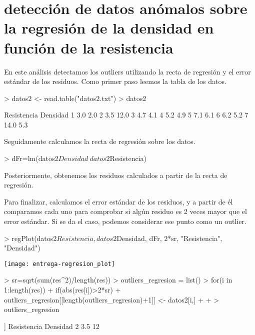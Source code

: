 \documentclass [a4paper] {article}
\begin{document}
\section{detección de datos anómalos sobre la regresión de la densidad en función de la resistencia}

En este análisis detectamos los outliers utilizando la recta de regresión y
el error estándar de los residuos. Como primer paso leemos la tabla de los datos.
\begin{Schunk}
\begin{Sinput}
> datos2 <- read.table("datos2.txt")
> datos2
\end{Sinput}
\begin{Soutput}
  Resistencia Densidad
1         3.0      2.0
2         3.5     12.0
3         4.7      4.1
4         5.2      4.9
5         7.1      6.1
6         6.2      5.2
7        14.0      5.3
\end{Soutput}
\end{Schunk}
Seguidamente calculamos la recta de regresión sobre los datos.
\begin{Schunk}
\begin{Sinput}
> dFr=lm(datos2$Densidad~datos2$Resistencia)
\end{Sinput}
\end{Schunk}
Posteriormente, obtenemos los residuos calculados a partir de la recta de regresión.
\begin{Schunk}
\end{Schunk}
Para finalizar, calculamos el error estándar de los residuos, y a partir de él comparamos cada
uno para comprobar si algún residuo es 2 veces mayor que el error estándar. Si se da el caso, 
podemos considerar ese punto como un outlier.
\begin{Schunk}
\begin{Sinput}
> regPlot(datos2$Resistencia, datos2$Densidad, dFr, 2*sr, "Resistencia", "Densidad")
\end{Sinput}
\end{Schunk}
\texttt{[image: entrega-regresion\_plot]}
\begin{Schunk}
\begin{Sinput}
> sr=sqrt(sum(res^2)/length(res))
> outliers_regresion = list()
> for(i in 1:length(res)){
+   if(abs(res[i])>2*sr){
+     outliers_regresion[[length(outliers_regresion)+1]] <- datos2[i,]
+   }
+ }
> outliers_regresion
\end{Sinput}
\begin{Soutput}
[[1]]
  Resistencia Densidad
2         3.5       12
\end{Soutput}
\end{Schunk}
\end{document}

